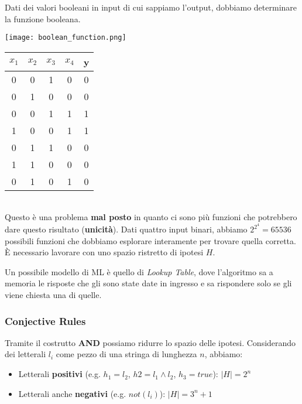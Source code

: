 \begin{example}
	Dati dei valori booleani in input di cui sappiamo l'output, dobbiamo determinare la funzione booleana.
	\begin{table}[!h]
		\centering
		\texttt{[image: boolean\_function.png]}
		\begin{tabular}{cccc|c}
			$x_1$ & $x_2$ & $x_3$ & $x_4$ & y \\
			\hline
			0 & 0 & 1 & 0 & 0 \\
			0 & 1 & 0 & 0 & 0 \\
			0 & 0 & 1 & 1 & 1 \\
			1 & 0 & 0  &1 & 1 \\
			0 & 1 & 1 & 0 & 0 \\
			1 & 1 & 0 & 0 & 0 \\
			0 & 1 & 0 & 1 & 0 \\
			\hline
		\end{tabular}
	\end{table}
	\\Questo è una problema \textbf{mal posto} in quanto ci sono più funzioni che potrebbero dare questo risultato (\textbf{unicità}).
	Dati quattro input binari, abbiamo $2^{2^4}= 65536 $ possibili funzioni che dobbiamo esplorare interamente per trovare quella corretta.\\
	È necessario lavorare con uno spazio ristretto di ipotesi $H$.
\end{example}
\begin{definition}
	Un possibile modello di ML è quello di \textit{Lookup Table}, dove l'algoritmo sa a memoria le risposte che gli sono state date in ingresso e sa rispondere solo se gli viene chiesta una di quelle.
\end{definition}
\subsubsection{Conjective Rules}
Tramite il costrutto \textbf{AND} possiamo ridurre lo spazio delle ipotesi. Considerando dei letterali $l_i$ come pezzo di una stringa di lunghezza $n$, abbiamo:
\begin{itemize}
	\item Letterali \textbf{positivi} (e.g. $h_1=l_2$, $h2=l_1 \land l_2$, $h_3=true$): $\lvert H \rvert = 2^n$
	\item Letterali anche \textbf{negativi} (e.g. $not(l_i)$): $\lvert H \rvert = 3^n + 1$
\end{itemize}

